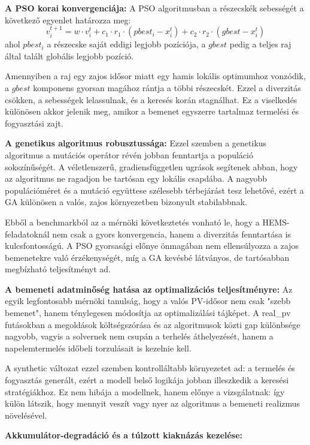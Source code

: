 \textbf{A PSO korai konvergenciája:}
A PSO algoritmusban a részecskék sebességét a következő egyenlet határozza meg:
\begin{equation}
v_i^{t+1} = w \cdot v_i^t + c_1 \cdot r_1 \cdot (pbest_i - x_i^t) + c_2 \cdot r_2 \cdot (gbest - x_i^t)
\end{equation}
ahol $pbest_i$ a részecske saját eddigi legjobb pozíciója, a $gbest$ pedig a teljes raj által talált globális legjobb pozíció.

Amennyiben a raj egy zajos idősor miatt egy hamis lokális optimumhoz vonzódik, a $gbest$ komponens gyorsan magához rántja a többi részecskét. Ezzel a diverzitás csökken, a sebességek lelassulnak, és a keresés korán stagnálhat. Ez a viselkedés különösen akkor jelenik meg, amikor a bemenet egyszerre tartalmaz termelési és fogyasztási zajt.

\textbf{A genetikus algoritmus robusztussága:}
Ezzel szemben a genetikus algoritmus a mutációs operátor révén jobban fenntartja a populáció sokszínűségét. A véletlenszerű, gradiensfüggetlen ugrások segítenek abban, hogy az algoritmus ne ragadjon be tartósan egy lokális csapdába. A nagyobb populációméret és a mutáció együttese szélesebb térbejárást tesz lehetővé, ezért a GA különösen a valós, zajos környezetben bizonyult stabilabbnak.

Ebből a benchmarkból az a mérnöki következtetés vonható le, hogy a HEMS-feladatoknál nem csak a gyors konvergencia, hanem a diverzitás fenntartása is kulcsfontosságú. A PSO gyorsasági előnye önmagában nem ellensúlyozza a zajos bemenetekre való érzékenységét, míg a GA kevésbé látványos, de tartósabban megbízható teljesítményt ad.

\textbf{A bemeneti adatminőség hatása az optimalizációs teljesítményre:}
Az egyik legfontosabb mérnöki tanulság, hogy a valós PV-idősor nem csak "szebb bemenet", hanem ténylegesen módosítja az optimalizálási tájképet. A real\_pv futásokban a megoldások költségszórása és az algoritmusok közti gap különbsége nagyobb, vagyis a solvernek nem csupán a terhelés áthelyezését, hanem a napelemtermelés időbeli torzulásait is kezelnie kell.

A synthetic változat ezzel szemben kontrolláltabb környezetet ad: a termelés és fogyasztás generált, ezért a modell belső logikája jobban illeszkedik a keresési stratégiákhoz. Ez nem hibája a modellnek, hanem előnye a vizsgálatnak: így külön látszik, hogy mennyit veszít vagy nyer az algoritmus a bemeneti realizmus növelésével.

\textbf{Akkumulátor-degradáció és a túlzott kiaknázás kezelése:}

